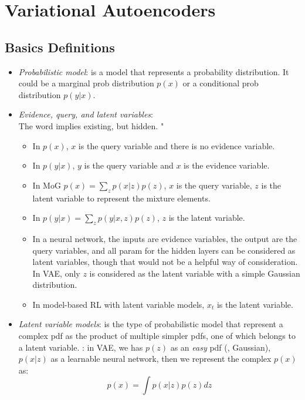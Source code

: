 \chapter{Variational Autoencoders}

\section{Basics Definitions}
\label{sec:vae-defs}
\begin{itemize}
	\item \textit{Probabilistic model}: is a model that represents a probability distribution. It could be a marginal \ac{prob} distribution $p(x)$ or a conditional \ac{prob} distribution $p(y|x)$.
	\item \textit{Evidence, query, and latent variables}:\\
	The word  implies existing, but hidden. \Eg"
	\begin{itemize}
		\item In $p(x)$, $x$ is the query variable and there is no evidence variable.
		\item In $p(y|x)$, $y$ is the query variable and $x$ is the evidence variable.
		\item In \ac{MoG} $p(x) = \sum_z p(x|z) p(z)$, $x$ is the query variable, $z$ is the latent variable to represent the mixture elements.		
		\item In $p(y|x) = \sum_z p(y|x,z) p(z)$, $z$ is the latent variable.
		\item In a neural network, the inputs are evidence variables, the output are the query variables, and all \ac{param} for the hidden layers can be considered as latent variables, though that would not be a helpful way of consideration. In \ac{VAE}, only $z$ is considered as the latent variable with a simple Gaussian distribution.
		\item In model-based \ac{RL} with latent variable models, $x_t$ is the latent variable.
	\end{itemize}
	\item \textit{Latent variable models}: is the type of probabilistic model that represent a complex \ac{pdf} as the product of multiple simpler \ac{pdf}s, one of which belongs to a latent variable. \Eg: in \ac{VAE}, we has $p(z)$ as an \textit{easy} \ac{pdf} (\eg, Gaussian), $p(x|z)$ as a learnable neural network, then we represent the complex $p(x)$ as:
	\[ p(x) = \int p(x|z) p(z) dz \]
\end{itemize}

